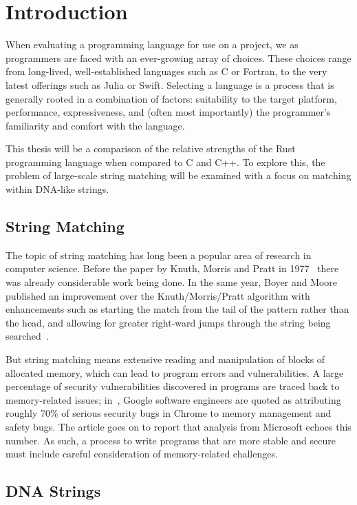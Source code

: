 \section{Introduction}
\label{sec:introduction}

When evaluating a programming language for use on a project, we as programmers are faced with an ever-growing array of choices. These choices range from long-lived, well-established languages such as C or Fortran, to the very latest offerings such as Julia or Swift. Selecting a language is a process that is generally rooted in a combination of factors: suitability to the target platform, performance, expressiveness, and (often most importantly) the programmer's familiarity and comfort with the language.

This thesis will be a comparison of the relative strengths of the Rust programming language when compared to C and C++. To explore this, the problem of large-scale string matching will be examined with a focus on matching within DNA-like strings.

\subsection{String Matching}

The topic of string matching has long been a popular area of research in computer science. Before the paper by Knuth, Morris and Pratt in 1977~\cite{knuth.morris.pratt.1977} there was already considerable work being done. In the same year, Boyer and Moore published an improvement over the Knuth/Morris/Pratt algorithm with enhancements such as starting the match from the tail of the pattern rather than the head, and allowing for greater right-ward jumps through the string being searched~\cite{boyer.moore.1977}.

But string matching means extensive reading and manipulation of blocks of allocated memory, which can lead to program errors and vulnerabilities. A large percentage of security vulnerabilities discovered in programs are traced back to memory-related issues; in~\cite{cimpanu.2020}, Google software engineers are quoted as attributing roughly 70\% of serious security bugs in Chrome to memory management and safety bugs. The article goes on to report that analysis from Microsoft echoes this number. As such, a process to write programs that are more stable and secure must include careful consideration of memory-related challenges.

\subsection{DNA Strings}

